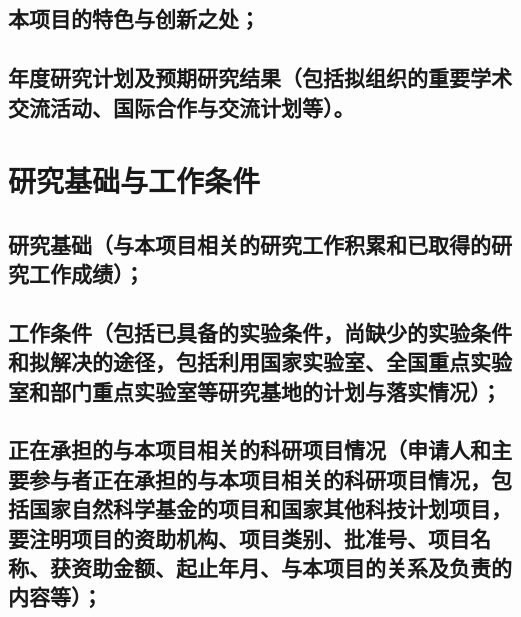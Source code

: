 \documentclass[UTF8, punct, oneside,fontset=none]{ctexbook}
\begin{document}
\begin{MS}
	
\end{MS}

\section{\textbf{本项目的特色与创新之处；}}

\begin{MS}
	
\end{MS}

\section{\textbf{年度研究计划及预期研究结果}\kg{0.2em}（包括拟组织的重要学术交流活动、国际合作与交流计划等）。}

\begin{MS}
	
\end{MS}

\chapter{\textbf{研究基础与工作条件}}
\section{\textbf{研究基础}\kg{0.2em}（与本项目相关的研究工作积累和已取得的研究工作成绩）；}

\begin{MS}
	
\end{MS}

\section{\textbf{工作条件}\kg{0.2em}（包括已具备的实验条件，\kg{0.2em}尚缺少的实验条件和拟解决的途径，包括利用国家实验室、全国重点实验室和部门重点实验室等研究基地的计划与落实情况）；}

\begin{MS}
	
\end{MS}

\section{\textbf{正在承担的与本项目相关的科研项目情况}\kg{0.3em}（申请人和主要参与者正在承担的与本项目相关的科研项目情况，包括国家自然科学基金的项目和国家其他科技计划项目，要注明项目的资助机构、\kg{0.1em}项目类别、\kg{0.1em}批准号、\kg{0.1em}项目名称、获资助金额、起止年月、与本项目的关系及负责的内容等）；}
\end{document}
